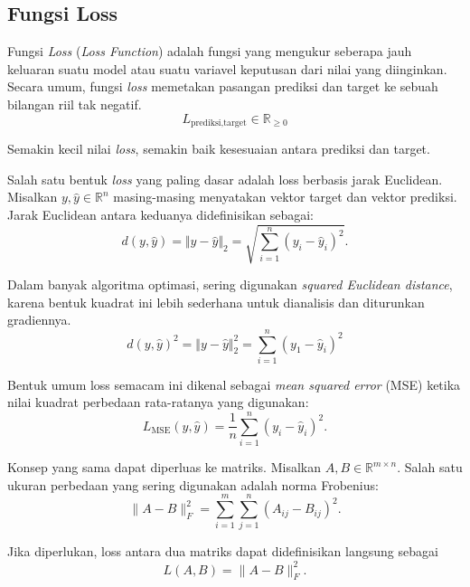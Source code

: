 \subsection{Fungsi Loss}

Fungsi \textit{Loss} (\textit{Loss Function}) adalah fungsi yang mengukur seberapa jauh keluaran suatu model atau suatu variavel keputusan dari nilai yang diinginkan. Secara umum, fungsi \textit{loss} memetakan pasangan prediksi dan target ke sebuah bilangan riil tak negatif.
$$
L_{\text{prediksi}, \text{target}} \in \mathbb{R}_{\ge 0}
$$

Semakin kecil nilai \textit{loss}, semakin baik kesesuaian antara prediksi dan target.

Salah satu bentuk \textit{loss} yang paling dasar adalah loss berbasis jarak Euclidean. Misalkan $y, \hat{y} \in \mathbb{R}^{n}$ masing-masing menyatakan vektor target dan vektor prediksi. Jarak Euclidean antara keduanya didefinisikan sebagai:
$$
    d(y, \hat{y}) = \Vert y - \hat{y} \Vert_2 = 
    \sqrt{ \sum_{i=1}^{n} (y_i - \hat{y}_i)^2 }.
$$

Dalam banyak algoritma optimasi, sering digunakan \textit{squared Euclidean distance}, karena bentuk kuadrat ini lebih sederhana untuk dianalisis dan diturunkan gradiennya.
$$
    d(y, \hat{y})^2 = \Vert y - \hat{y} \Vert_2^2 = \sum_{i = 1}^n (y_1 - \hat{y}_i)^2
$$

Bentuk umum loss semacam ini dikenal sebagai \textit{mean squared error} (MSE) ketika nilai kuadrat perbedaan rata-ratanya yang digunakan:
\[
    L_{\mathrm{MSE}}(y, \hat{y}) 
    = \frac{1}{n} \sum_{i=1}^{n} (y_i - \hat{y}_i)^2.
\]

Konsep yang sama dapat diperluas ke matriks. Misalkan $A, B \in \mathbb{R}^{m \times n}$. Salah satu ukuran perbedaan yang sering digunakan adalah norma Frobenius:
$$
    \| A - B \|_F^2 
    = \sum_{i=1}^{m} \sum_{j=1}^{n} (A_{ij} - B_{ij})^2.
$$

Jika diperlukan, loss antara dua matriks dapat didefinisikan langsung sebagai
$$
    L(A,B) = \| A - B \|_F^2.
$$
